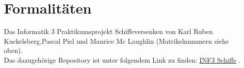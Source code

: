 \section*{Formalitäten}

Das Informatik 3 Praktikumsprojekt Schiffeversenken von Karl Ruben Kuckelsberg,\newline Pascal Piel und Maurice Mc Laughlin (Matrikelnummern siehe oben).\\
Das dazugehörige Repository ist unter folgendem Link zu finden: \href{https://github.com/karuku97/INF3_Schiffe}{INF3 Schiffe} .

